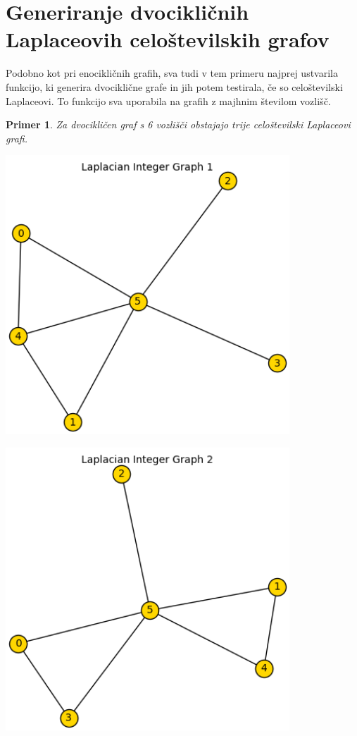 \documentclass{article}
\newtheorem{primer}{Primer}
\begin{document}
\section{Generiranje dvocikličnih Laplaceovih celoštevilskih grafov}
Podobno kot pri enocikličnih grafih, sva tudi v tem primeru najprej ustvarila funkcijo, ki generira dvociklične grafe in jih potem testirala, če so celoštevilski 
Laplaceovi. To funkcijo sva uporabila na grafih z majhnim številom vozlišč.  \\
\begin{primer}
    Za dvocikličen graf s 6 vozlišči obstajajo trije celoštevilski Laplaceovi grafi. \\
    \begin{minipage}{0.3\textwidth}
        \centering
        \includegraphics[width=0.8\textwidth]{dvociklični1.png}
    \end{minipage}
    \begin{minipage}{0.3\textwidth}
        \centering
        \includegraphics[width=0.8\textwidth]{dvociklični2.png}

\end{minipage}
\end{primer}
\end{document}
